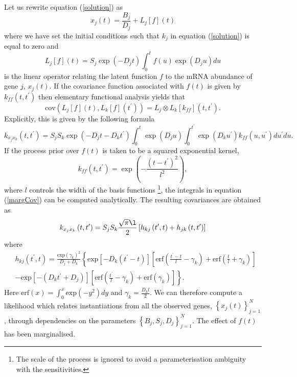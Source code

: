 \documentclass[english]{article}
\begin{document}
Let us rewrite equation (\ref{solution}) as\[
x_j\left(t\right) = \frac{B_j}{D_j}+L_j\left[f\right]\left(t\right)\]
where we have set the initial conditions such that $k_j$ in equation 
(\ref{solution}) is equal to zero and
\begin{equation}L_j\left[f\right]\left(t\right) = S_{j}
\exp\left(-D_{j}t\right)\int_{0}^{t}f\left(u\right)\exp\left(D_{j}u\right)du
\label{operators}\end{equation}
is the linear operator relating the latent function $f$ to the mRNA abundance
of gene $j$, $x_j\left(t\right)$.  
If the covariance function associated with $f\left(t\right)$ is given
by $k_{ff}\left(t,t^{\prime}\right)$ then elementary functional analysis
yields that \[
\textrm{cov}\left(L_j\left[f\right]\left(t\right),L_k\left[f\right]\left(
t^\prime\right)\right) = L_j\otimes L_k\left[k_{ff}\right]\left(t, t^\prime
\right).\]
Explicitly, this is given by the following formula \begin{equation}
k_{x_{j}x_{k}}\left(t,t^{\prime}\right) =  S_{j}S_{k}\exp\left(-D_{j}t-D_{k}t^{\prime}\right)\int_{0}^{t}\exp\left(D_{j}u\right)\int_{0}^{t^{\prime}}\exp\left(D_{k}u^{\prime}\right)k_{ff}\left(u,u^{\prime}\right)du^{\prime}du.
\label{margCov}\end{equation} 
If the process prior over $f\left(t\right)$
is taken to be a squared exponential kernel, \[
k_{ff}\left(t,t^{\prime}\right) = \exp\left(-\frac{\left(t-t^{\prime}\right)^{2}}{l^{2}}\right),\]
where $l$ controls the width of the basis functions%
\footnote{The scale of the process is ignored to avoid a parameterisation ambiguity
with the sensitivities.%
}, the integrals in equation (\ref{margCov}) can be computed analytically.
The resulting covariances are obtained as
\begin{equation}
k_{x_jx_k}\left( t,t^{\prime}\right) = S_jS_k\frac{\sqrt{\pi}\l}{2} 
\left[h_{kj}\left(t^{\prime},t\right)+h_{jk}\left(t,t^{\prime}\right)\right]
\end{equation} 
where \begin{equation*}\begin{split}
&h_{kj}\left(t^{\prime},t\right) =
\frac{\textrm{exp}\left(\gamma_k\right)^2}{D_j+D_k}
\left\{\textrm{exp}\left[-D_k\left(t^{\prime}-t\right)\right]
\left[\textrm{erf}\left(\frac{t^{\prime}-t}{l}-\gamma_k\right)+\textrm{erf}\left(\frac{t}{l}+\gamma_k\right)\right]\right. \\
&\left. -\textrm{exp}\left[-\left(D_kt^{\prime}+D_j\right)\right]\left[\textrm{erf}\left(\frac{t^{\prime}}{l}-\gamma_k\right)+\textrm{erf}\left(\gamma_k\right)\right]\right\}.
\end{split}\end{equation*}
Here $\textrm{erf}(x) = \int_0^x\textrm{exp}\left(-y^2\right)dy$ and 
$\gamma_k=\frac{D_kl}{2}$. 
We can therefore
compute a likelihood which relates instantiations from all the observed
genes, $\left\{ x_{j}\left(t\right)\right\} _{j=1}^{N}$, through
dependencies on the parameters $\left\{ B_{j},S_{j},D_{j}\right\} _{j=1}^{N}$.
The effect of $f\left(t\right)$ has been marginalised. 
\end{document}
